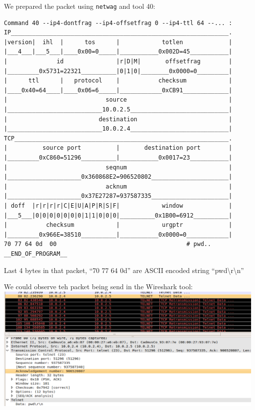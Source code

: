 \documentclass[12pt, a4paper, pdflatex]{article}
\begin{document}
We prepared the packet using \texttt{netwag} and tool 40:\\
\begin{verbatim}
Command 40 --ip4-dontfrag --ip4-offsetfrag 0 --ip4-ttl 64 --... :
IP______________________________________________________________.
|version|  ihl  |      tos      |            totlen             |
|___4___|___5___|____0x00=0_____|___________0x002D=45___________|
|              id               |r|D|M|       offsetfrag        |
|_________0x5731=22321__________|0|1|0|________0x0000=0_________|
|      ttl      |   protocol    |           checksum            |
|____0x40=64____|____0x06=6_____|____________0xCB91_____________|
|                            source                             |
|___________________________10.0.2.5____________________________|
|                          destination                          |
|___________________________10.0.2.4____________________________|
TCP_____________________________________________________________.
|          source port          |       destination port        |
|_________0xC860=51296__________|___________0x0017=23___________|
|                            seqnum                             |
|_____________________0x360868E2=906520802______________________|
|                            acknum                             |
|_____________________0x37E27287=937587335______________________|
| doff  |r|r|r|r|C|E|U|A|P|R|S|F|            window             |
|___5___|0|0|0|0|0|0|0|1|1|0|0|0|__________0x1B00=6912__________|
|           checksum            |            urgptr             |
|_________0x966E=38510__________|___________0x0000=0____________|
70 77 64 0d  00                                     # pwd..
__END_OF_PROGRAM__
\end{verbatim}
Last 4 bytes in that packet, ``70 77 64 0d'' are ASCII encoded string ``pwd\textbackslash r\textbackslash n''


We could observe teh packet being send in the Wireshark tool:\\ \includegraphics[width=.95\textwidth]{gfx/request.png}\\
\end{document}
